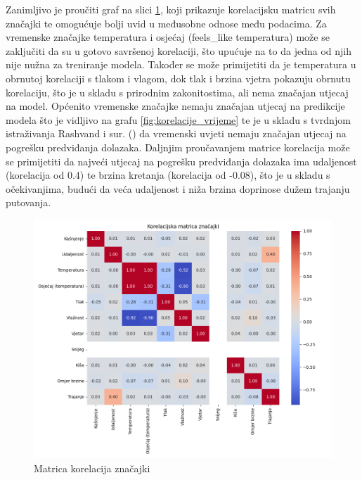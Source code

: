 \documentclass[seminarskirad]{fer}
\begin{document}
Zanimljivo je proučiti graf na slici \ref{slk:korelacije_znacajki}, koji prikazuje korelacijsku matricu svih značajki te omogućuje bolji uvid u međusobne odnose među podacima. Za vremenske značajke temperatura i osjećaj (feels\_like temperatura) može se zaključiti da su u gotovo savršenoj korelaciji, što upućuje na to da jedna od njih nije nužna za treniranje modela. Također se može primijetiti da je temperatura u obrnutoj korelaciji s tlakom i vlagom, dok tlak i brzina vjetra pokazuju obrnutu korelaciju, što je u skladu s prirodnim zakonitostima, ali nema značajan utjecaj na model. Općenito vremenske značajke nemaju značajan utjecaj na predikcije modela što je vidljivo na grafu \ref{fig:korelacije_vrijeme} te je u skladu s tvrdnjom istraživanja Rashvand i sur. (\cite{article1}) da vremenski uvjeti nemaju značajan utjecaj na pogrešku predviđanja dolazaka.
Daljnjim proučavanjem matrice korelacija može se primijetiti da najveći utjecaj na pogrešku predviđanja dolazaka ima udaljenost (korelacija od 0.4) te brzina kretanja (korelacija od -0.08), što je u skladu s očekivanjima, budući da veća udaljenost i niža brzina doprinose dužem trajanju putovanja.

\begin{figure}[htb]
	\centering
	\includegraphics[width=0.9\linewidth]{Figures/korelacija_znacajki.png} 
	\caption{Matrica korelacija značajki}
	\label{slk:korelacije_znacajki}
\end{figure}
\end{document}
